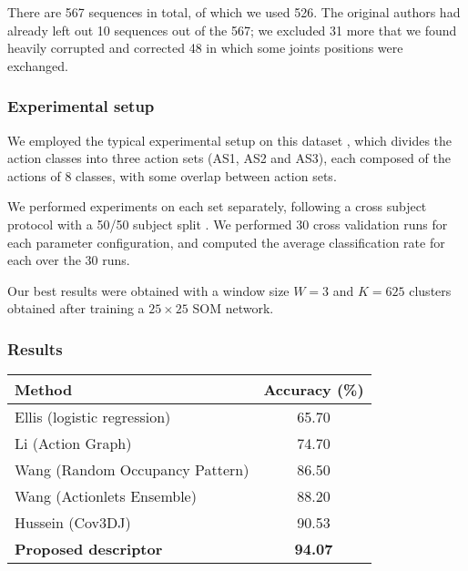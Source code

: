 \documentclass{fcs}
\begin{document}
There are 567 sequences in total, of which we used 526. The original authors had already left out 10 sequences out of the 567; we excluded 31 more that we found heavily corrupted and corrected 48 in which some joints positions were exchanged\cite{li2010action}. 

\subsubsection{Experimental setup}
We employed the typical experimental setup on this dataset \cite{li2010action}, which divides the action classes into three action sets (AS1, AS2 and AS3), each composed of the actions of 8 classes, with some overlap between action sets.


We performed experiments on each set separately, following a cross subject protocol with a 50/50 subject split \cite{li2010action}. We performed 30 cross validation runs for each parameter configuration, and computed the average classification rate for each over the 30 runs. 

Our best results were obtained with a window size $W=3$ and $K=625$ clusters obtained after training a $25 \times 25$ SOM network.



\subsubsection{Results}

\begin{table}
\begin{footnotesize}

\begin{tabular}{ | p{5cm} | c | } 
	 \hline
	 \rowcolor{lightgray}
	 \centering \textbf{Method} & \textbf{ Accuracy (\%)}  \\ 
	 \hline
	 Ellis (logistic regression) \cite{Ellis2013} & 65.70 \\ 
	 \hline
 	 Li (Action Graph) \cite{li2010action} & 74.70 \\ 
	 \hline
	 Wang (Random Occupancy Pattern)  \cite{wang2012robust} & 86.50 \\ 
	 \hline
	 Wang (Actionlets Ensemble) \cite{wang2012actionlet} & 88.20 \\ 
	 \hline
	 Hussein (Cov3DJ) \cite{hussein2013human} & 90.53\\ 
	 \hline	 
	 \textbf{Proposed descriptor} & \textbf{94.07}  \\ 
	 \hline
\end{tabular}

\label{table_acc_action3D_comparativa}
\end{footnotesize}
\end{table}
\end{document}
